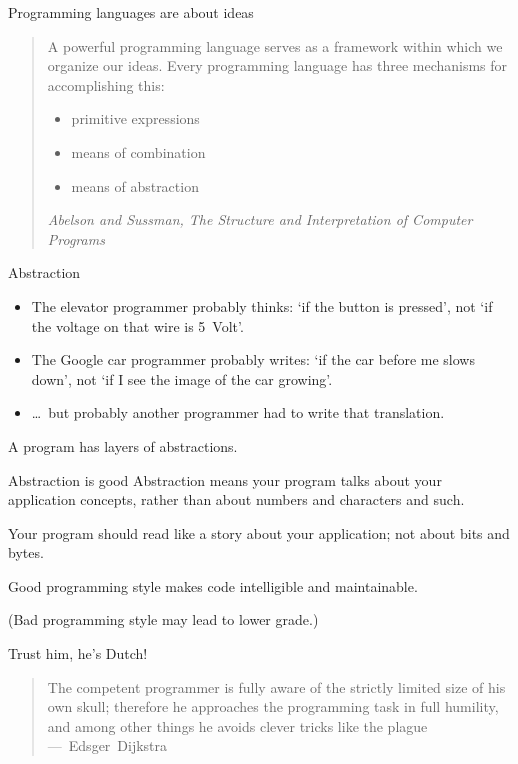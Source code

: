 \begin{block}{Programming languages are about ideas}
  \label{sl:sussman}
  \begin{quotation}
    \raggedright\noindent
    A powerful programming language serves as a framework within which
    we organize our ideas. Every programming language has three
    mechanisms for accomplishing this:
    \begin{itemize}
    \item primitive expressions
    \item means of combination
    \item means of abstraction
    \end{itemize}
    \textsl{Abelson and Sussman, The Structure and Interpretation of
      Computer Programs}
  \end{quotation}
\end{block}

\begin{block}{Abstraction}
  \label{sl:abstraction}
  \begin{itemize}
  \item The elevator programmer probably thinks: `if the button is
    pressed', not `if the voltage on that wire is 5~Volt'.
  \item The Google car programmer probably writes: `if the car before me
    slows down', not `if I see the image of the car growing'.
  \item \ldots~but probably another programmer had to write that translation.
  \end{itemize}
  A program has layers of abstractions.
\end{block}

\begin{block}{Abstraction is good}
  \label{sl:abstraction-good}
  Abstraction means your program talks about your application
  concepts, rather than about numbers and characters and such.

  Your program should read like a story about your application; not
  about bits and bytes.

  Good programming style makes code intelligible and maintainable.

  (Bad programming style may lead to lower grade.)
\end{block}

\begin{block}{Trust him, he's Dutch!}
  \label{sl:dijkstra-trick}
  \begin{quotation}
    \raggedright\noindent
    The competent programmer is fully aware of the strictly limited
    size of his own skull; therefore he approaches the programming
    task in full humility, and among other things he avoids clever
    tricks like the plague ---~Edsger~Dijkstra
  \end{quotation}  
\end{block}

